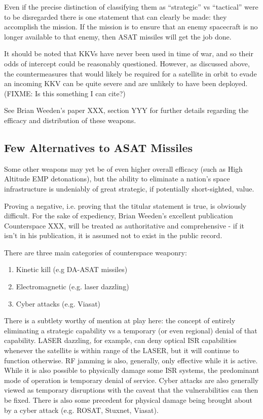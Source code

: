 Even if the precise distinction of classifying them as ``strategic''
vs ``tactical'' were to be disregarded there is one statement that can
clearly be made: they accomplish the mission.  If the mission is to
ensure that an enemy spacecraft is no longer available to that enemy,
then ASAT missiles will get the job done.

It should be noted that KKVs have never been used in time of war, and
so their odds of intercept could be reasonably questioned.  However,
as discussed above, the countermeasures that would likely be required
for a satellite in orbit to evade an incoming KKV can be quite severe
and are unlikely to have been deployed.(FIXME: Is this something I can
cite?)

See Brian Weeden's paper XXX, section YYY for further details
regarding the efficacy and distribution of these weapons.

\subsection{Few Alternatives to ASAT Missiles}

Some other weapons may yet be of even higher overall efficacy (such as
High Altitude EMP detonations), but the ability to eliminate a
nation's space infrastructure is undeniably of great strategic, if
potentially short-sighted, value.

Proving a negative, i.e. proving that the titular statement is true,
is obviously difficult.  For the sake of expediency, Brian Weeden's
excellent publication Counterspace XXX, will be treated as
authoritative and comprehensive - if it isn't in his publication, it
is assumed not to exist in the public record.

There are three main categories of counterspace weaponry:
\begin{enumerate}
\item Kinetic kill (e.g DA-ASAT missiles)
\item Electromagnetic (e.g. laser dazzling)
\item Cyber attacks (e.g. Viasat)
\end{enumerate}

There is a subtlety worthy of mention at play here: the concept of
entirely eliminating a strategic capability vs a temporary (or even
regional) denial of that capability.  LASER dazzling, for example, can
deny optical ISR capabilities whenever the satellite is within range
of the LASER, but it will continue to function otherwise.  RF jamming
is also, generally, only effective while it is active.  While it is
also possible to physically damage some ISR systems, the predominant
mode of operation is temporary denial of service.  Cyber attacks are
also generally viewed as temporary disruptions with the caveat that
the vulnerabilities can then be fixed.  There is also some precedent
for physical damage being brought about by a cyber attack (e.g. ROSAT,
Stuxnet, Viasat).


